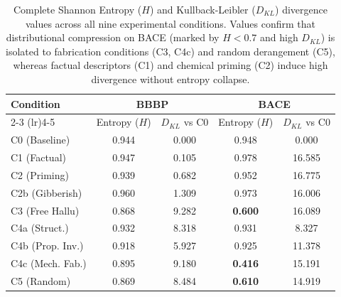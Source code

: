 \begin{table}[ht]
\centering
\caption{Complete Shannon Entropy ($H$) and Kullback-Leibler ($D_{KL}$) divergence values across all nine experimental conditions. Values confirm that distributional compression on BACE (marked by $H < 0.7$ and high $D_{KL}$) is isolated to fabrication conditions (C3, C4c) and random derangement (C5), whereas factual descriptors (C1) and chemical priming (C2) induce high divergence without entropy collapse.}
\label{tab:entropy_all}
\begin{tabular}{lcccc}
\toprule
\textbf{Condition} & \multicolumn{2}{c}{\textbf{BBBP}} & \multicolumn{2}{c}{\textbf{BACE}} \\
\cmidrule(lr){2-3} \cmidrule(lr){4-5}
 & Entropy ($H$) & $D_{KL}$ vs C0 & Entropy ($H$) & $D_{KL}$ vs C0 \\
\midrule
C0 (Baseline) & 0.944 & 0.000 & 0.948 & 0.000 \\
C1 (Factual) & 0.947 & 0.105 & 0.978 & 16.585 \\
C2 (Priming) & 0.939 & 0.682 & 0.952 & 16.775 \\
C2b (Gibberish) & 0.960 & 1.309 & 0.973 & 16.006 \\
C3 (Free Hallu) & 0.868 & 9.282 & \textbf{0.600} & 16.089 \\
C4a (Struct.) & 0.932 & 8.318 & 0.931 & 8.327 \\
C4b (Prop. Inv.) & 0.918 & 5.927 & 0.925 & 11.378 \\
C4c (Mech. Fab.) & 0.895 & 9.180 & \textbf{0.416} & 15.191 \\
C5 (Random) & 0.869 & 8.484 & \textbf{0.610} & 14.919 \\
\bottomrule
\end{tabular}
\end{table}
